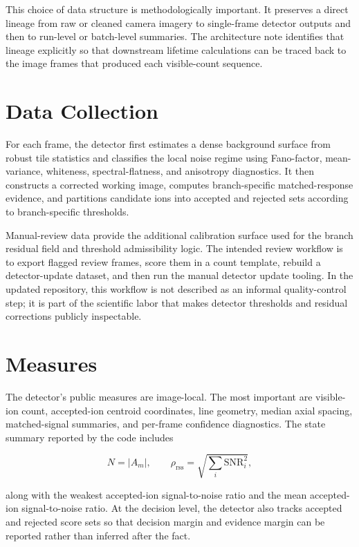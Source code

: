 \documentclass[12pt]{report}
\begin{document}
This choice of data structure is methodologically important. It preserves a direct lineage from raw or cleaned camera imagery to single-frame detector outputs and then to run-level or batch-level summaries. The architecture note identifies that lineage explicitly so that downstream lifetime calculations can be traced back to the image frames that produced each visible-count sequence.

\section{Data Collection}

For each frame, the detector first estimates a dense background surface from robust tile statistics and classifies the local noise regime using Fano-factor, mean-variance, whiteness, spectral-flatness, and anisotropy diagnostics. It then constructs a corrected working image, computes branch-specific matched-response evidence, and partitions candidate ions into accepted and rejected sets according to branch-specific thresholds.

Manual-review data provide the additional calibration surface used for the branch residual field and threshold admissibility logic. The intended review workflow is to export flagged review frames, score them in a count template, rebuild a detector-update dataset, and then run the manual detector update tooling. In the updated repository, this workflow is not described as an informal quality-control step; it is part of the scientific labor that makes detector thresholds and residual corrections publicly inspectable.

\section{Measures}

The detector's public measures are image-local. The most important are visible-ion count, accepted-ion centroid coordinates, line geometry, median axial spacing, matched-signal summaries, and per-frame confidence diagnostics. The state summary reported by the code includes

$$
N = |A_m|, \qquad
\rho_{\mathrm{rss}} = \sqrt{\sum_i \mathrm{SNR}_i^2},
$$

along with the weakest accepted-ion signal-to-noise ratio and the mean accepted-ion signal-to-noise ratio. At the decision level, the detector also tracks accepted and rejected score sets so that decision margin and evidence margin can be reported rather than inferred after the fact.
\end{document}
